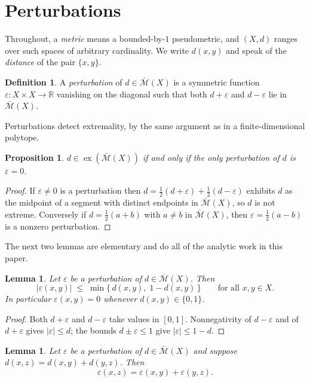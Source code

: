\documentclass[11pt]{article}
\newtheorem{lemma}[theorem]{Lemma}
\newtheorem{proposition}[theorem]{Proposition}
\theoremstyle{definition}
\newtheorem{definition}[theorem]{Definition}
\theoremstyle{remark}
\newcommand{\R}{\mathbb{R}}
\newcommand{\bM}{\bar{\mathcal{M}}}
\newcommand{\ex}{\operatorname{ex}}
\newcommand{\eps}{\varepsilon}
\begin{document}
\section{Perturbations}
\label{sec:prelim}

Throughout, a \emph{metric} means a bounded-by-$1$ pseudometric, and $(X,d)$ ranges over
such spaces of arbitrary cardinality. We write $d(x,y)$ and speak of the \emph{distance}
of the pair $\{x,y\}$.

\begin{definition}\label{def:perturbation}
A \emph{perturbation} of $d\in\bM(X)$ is a symmetric function $\eps\colon X\times X\to\R$
vanishing on the diagonal such that both $d+\eps$ and $d-\eps$ lie in $\bM(X)$.
\end{definition}

Perturbations detect extremality, by the same argument as in a finite-dimensional polytope.

\begin{proposition}\label{prop:extreme-iff}
$d\in\ex(\bM(X))$ if and only if the only perturbation of $d$ is $\eps=0$.
\end{proposition}

\begin{proof}
If $\eps\neq0$ is a perturbation then $d=\tfrac12(d+\eps)+\tfrac12(d-\eps)$ exhibits $d$ as
the midpoint of a segment with distinct endpoints in $\bM(X)$, so $d$ is not extreme.
Conversely if $d=\tfrac12(a+b)$ with $a\neq b$ in $\bM(X)$, then $\eps=\tfrac12(a-b)$ is a
nonzero perturbation.
\end{proof}

The next two lemmas are elementary and do all of the analytic work in this paper.

\begin{lemma}\label{lem:bound}
Let $\eps$ be a perturbation of $d\in\bM(X)$. Then
\[
|\eps(x,y)|\;\le\;\min\bigl\{\,d(x,y),\;1-d(x,y)\,\bigr\}
\qquad\text{for all }x,y\in X .
\]
In particular $\eps(x,y)=0$ whenever $d(x,y)\in\{0,1\}$.
\end{lemma}

\begin{proof}
Both $d+\eps$ and $d-\eps$ take values in $[0,1]$. Nonnegativity of $d-\eps$ and of
$d+\eps$ gives $|\eps|\le d$; the bounds $d\pm\eps\le1$ give $|\eps|\le 1-d$.
\end{proof}

\begin{lemma}\label{lem:tight}
Let $\eps$ be a perturbation of $d\in\bM(X)$ and suppose $d(x,z)=d(x,y)+d(y,z)$. Then
\[
\eps(x,z)=\eps(x,y)+\eps(y,z).
\]
\end{lemma}
\end{document}
